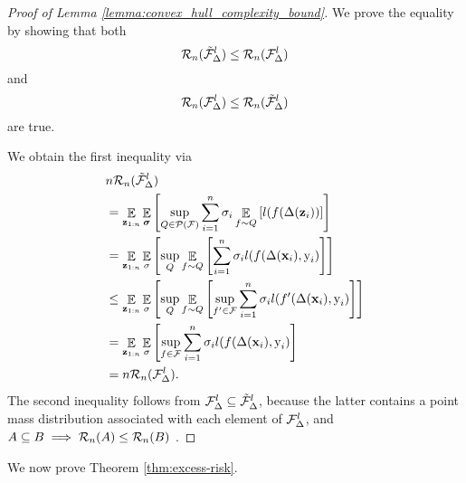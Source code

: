 \begin{proof}[Proof of Lemma \ref{lemma:convex_hull_complexity_bound}]
We prove the equality by showing that both
\begin{equation}
    {\mathcal{R}}_n(\tilde{{\mathcal{F}}}^l_\Delta) \leq {\mathcal{R}}_n({\mathcal{F}}^l_\Delta)
\end{equation}
and
\begin{equation}
    {\mathcal{R}}_n({\mathcal{F}}^l_\Delta) \leq {\mathcal{R}}_n(\tilde{{\mathcal{F}}}^l_\Delta)
\end{equation}
are true.

We obtain the first inequality via
\begin{equation}
    \begin{split}
        &n{\mathcal{R}}_{n}(\tilde{{\mathcal{F}}}^{l}_{\Delta}) \\ &=\mathop{\mathbb{E}}_{{\mathbf{z}}_{1:n}}\mathop{\mathbb{E}}_{{\bm{\sigma}}} \left[ \sup_{Q \in \mathcal{P}(\mathcal{F})} \sum_{i=1}^{n} \sigma_{i} \mathop{\mathbb{E}}_{f \sim Q}\left[ l(f(\Delta({\mathbf{z}}_{i})) \right]\right]\\
        &= \mathop{\mathbb{E}}_{{\mathbf{z}}_{1:n}}\mathop{\mathbb{E}}_{\sigma} \left[ \sup_{Q} \mathop{\mathbb{E}}_{f \sim Q} \left[ \sum_{i=1}^{n} \sigma_{i} l(f(\Delta({\mathbf{x}}_{i}), {\textnormal{y}}_i) \right] \right]\\
        &\leq \mathop{\mathbb{E}}_{{\mathbf{z}}_{1:n}}\mathop{\mathbb{E}}_{\sigma} \left[ \sup_{Q} \mathop{\mathbb{E}}_{f \sim Q} \left[ \sup_{f^\prime \in {\mathcal{F}}} \sum_{i=1}^{n} \sigma_{i} l(f^\prime(\Delta({\mathbf{x}}_{i}), {\textnormal{y}}_i) \right] \right]\\
        &= \mathop{\mathbb{E}}_{{\mathbf{z}}_{1:n}}\mathop{\mathbb{E}}_{\sigma} \left[ \sup_{f \in \mathcal{F}} \sum_{i=1}^{n}\sigma_{i} l(f(\Delta({\mathbf{x}}_{i}), {\textnormal{y}}_i) \right]\\
        &= n{\mathcal{R}}_{n}(\mathcal{F}^{l}_{\Delta}).
    \end{split}
\end{equation}
The second inequality follows from ${\mathcal{F}}^l_\Delta \subseteq \tilde{{\mathcal{F}}}^l_\Delta$, because the latter contains a point mass distribution associated with each element of ${\mathcal{F}}^l_\Delta$, and $A \subseteq B \implies {\mathcal{R}}_{n}(A) \leq {\mathcal{R}}_{n}(B)$ \citep{bartlett2002rademacher}.
\end{proof}

We now prove Theorem \ref{thm:excess-risk}.

